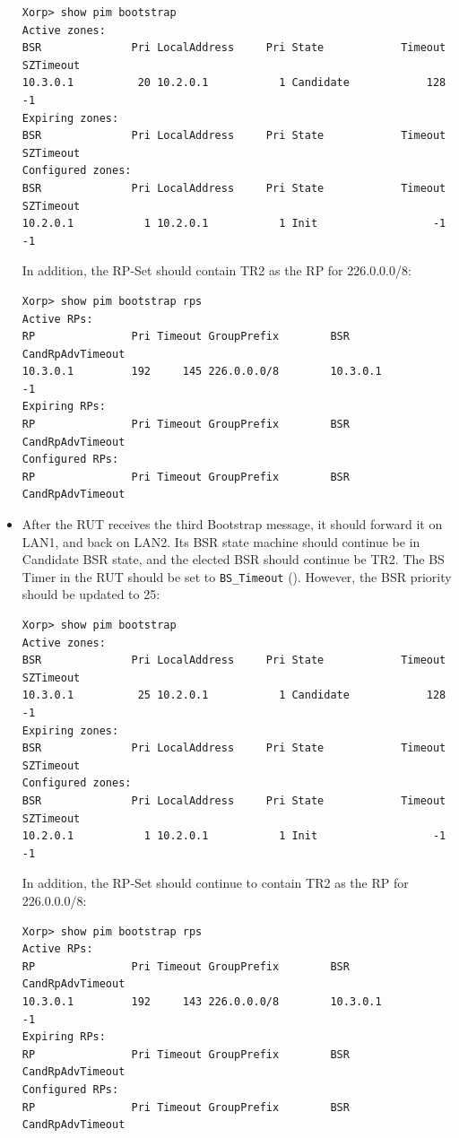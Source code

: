 \documentclass[11pt]{report}
\begin{document}
\begin{itemize}
\begin{verbatim}
Xorp> show pim bootstrap 
Active zones:
BSR              Pri LocalAddress     Pri State            Timeout SZTimeout
10.3.0.1          20 10.2.0.1           1 Candidate            128        -1
Expiring zones:
BSR              Pri LocalAddress     Pri State            Timeout SZTimeout
Configured zones:
BSR              Pri LocalAddress     Pri State            Timeout SZTimeout
10.2.0.1           1 10.2.0.1           1 Init                  -1        -1
\end{verbatim}

  In addition, the RP-Set should contain TR2 as the RP for 226.0.0.0/8:

\begin{verbatim}
Xorp> show pim bootstrap rps 
Active RPs:
RP               Pri Timeout GroupPrefix        BSR         CandRpAdvTimeout
10.3.0.1         192     145 226.0.0.0/8        10.3.0.1                  -1
Expiring RPs:
RP               Pri Timeout GroupPrefix        BSR         CandRpAdvTimeout
Configured RPs:
RP               Pri Timeout GroupPrefix        BSR         CandRpAdvTimeout
\end{verbatim}

  \item After the RUT receives the third Bootstrap message, it should forward
        it on LAN1, and back on LAN2. Its BSR state machine
        should continue be in Candidate BSR state, and the elected BSR should
        continue be TR2.
        The BS Timer in the RUT should be set to \verb=BS_Timeout=
        ({\PimsmBSTimeout}). However, the BSR priority should be updated to 25:

\begin{verbatim}
Xorp> show pim bootstrap 
Active zones:
BSR              Pri LocalAddress     Pri State            Timeout SZTimeout
10.3.0.1          25 10.2.0.1           1 Candidate            128        -1
Expiring zones:
BSR              Pri LocalAddress     Pri State            Timeout SZTimeout
Configured zones:
BSR              Pri LocalAddress     Pri State            Timeout SZTimeout
10.2.0.1           1 10.2.0.1           1 Init                  -1        -1
\end{verbatim}

  In addition, the RP-Set should continue to contain TR2 as the RP for
  226.0.0.0/8:

\begin{verbatim}
Xorp> show pim bootstrap rps 
Active RPs:
RP               Pri Timeout GroupPrefix        BSR         CandRpAdvTimeout
10.3.0.1         192     143 226.0.0.0/8        10.3.0.1                  -1
Expiring RPs:
RP               Pri Timeout GroupPrefix        BSR         CandRpAdvTimeout
Configured RPs:
RP               Pri Timeout GroupPrefix        BSR         CandRpAdvTimeout
\end{verbatim}

\end{itemize}
\end{document}
